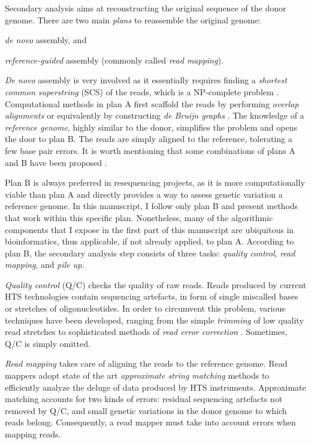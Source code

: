 Secondary analysis aims at reconstructing the original sequence of the donor genome.
There are two main \emph{plans} to reassemble the original genome: \begin{inparaenum}[(A)]
\item \emph{de novo} assembly, and
\item \emph{reference-guided} assembly (commonly called \emph{read mapping}).
\end{inparaenum}
\emph{De novo} assembly is very involved as it essentially requires finding a \emph{shortest common superstring} (SCS) of the reads, which is a NP-complete problem \citep{Maier1977,Gallant1980,Turner1989}.
Computational methods in plan A first scaffold the reads by performing \emph{overlap alignments} \citep{Myers2005} or equivalently by constructing \emph{de Bruijn graphs} \citep{Pevzner2001}.
The knowledge of a \emph{reference genome}, highly similar to the donor, simplifies the problem and opens the door to plan B.
The reads are simply aligned to the reference, tolerating a few base pair errors.
It is worth mentioning that some combinations of plans A and B have been proposed \citep{Li2012}.

Plan B is always preferred in resequencing projects, as it is more computationally viable than plan A and directly provides a way to assess genetic variation \wrt a reference genome.
In this manuscript, I follow only plan B and present methods that work within this specific plan.
Nonetheless, many of the algorithmic components that I expose in the first part of this manuscript are ubiquitous in bioinformatics, thus applicable, if not already applied, to plan A.
According to plan B, the secondary analysis step consists of three tasks: \emph{quality control}, \emph{read mapping}, and \emph{pile up}.

\emph{Quality control} (Q/C) checks the quality of raw reads.
Reads produced by current HTS technologies contain sequencing artefacts, in form of single miscalled bases or stretches of oligonucleotides.
In order to circumvent this problem, various techniques have been developed, ranging from the simple \emph{trimming} of low quality read stretches to sophisticated methods of \emph{read error correction} \citep{Weese2013a}.
Sometimes, Q/C is simply omitted.

\emph{Read mapping} takes care of aligning the reads to the reference genome.
Read mappers adopt state of the art \emph{approximate string matching} methods to efficiently analyze the deluge of data produced by HTS instruments.
Approximate matching accounts for two kinds of errors:
residual sequencing artefacts not removed by Q/C, and small genetic variations in the donor genome to which reads belong.
Consequently, a read mapper must take into account errors when mapping reads.

